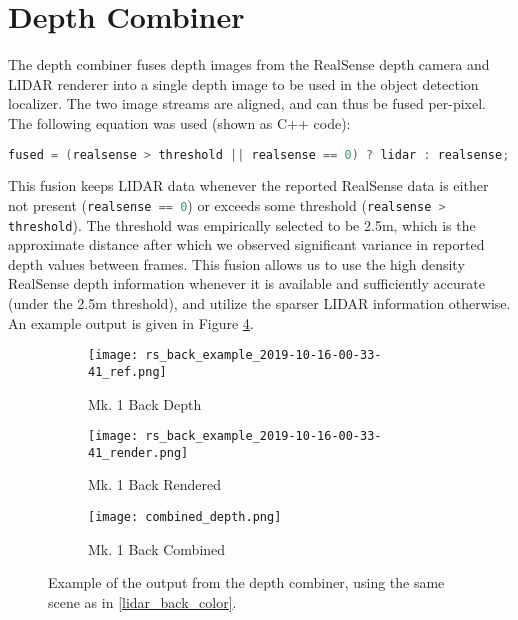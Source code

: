 \section{Depth Combiner}

The depth combiner fuses depth images from the RealSense depth camera and LIDAR renderer into a single depth image to be used in the object detection localizer. The two image streams are aligned, and can thus be fused per-pixel. The following equation was used (shown as C++ code):

\begin{lstlisting}[language=c++]
fused = (realsense > threshold || realsense == 0) ? lidar : realsense;
\end{lstlisting}

This fusion keeps LIDAR data whenever the reported RealSense data is either not present (\lstinline[language=c++]{realsense == 0}) or exceeds some threshold (\lstinline[language=c++]{realsense > threshold}). The threshold was empirically selected to be 2.5m, which is the approximate distance after which we observed significant variance in reported depth values between frames. This fusion allows us to use the high density RealSense depth information whenever it is available and sufficiently accurate (under the 2.5m threshold), and utilize the sparser LIDAR information otherwise. An example output is given in Figure \ref{combined_depth}.

\begin{figure}
	\centering
	\begin{subfigure}{0.3\textwidth}
		\texttt{[image: rs\_back\_example\_2019-10-16-00-33-41\_ref.png]}
		\caption{Mk. 1 Back Depth}
		\label{combined_depth_realsense}		
	\end{subfigure}
	\hfill
	\begin{subfigure}{0.3\textwidth}
		\texttt{[image: rs\_back\_example\_2019-10-16-00-33-41\_render.png]}
		\caption{Mk. 1 Back Rendered}
		\label{combined_depth_lidar}
	\end{subfigure}	
	\hfill
	\begin{subfigure}{0.3\textwidth}
		\texttt{[image: combined\_depth.png]}
		\caption{Mk. 1 Back Combined}
		\label{combined_depth_output}
	\end{subfigure}		
	\caption[Depth combiner sample output]{Example of the output from the depth combiner, using the same scene as in \ref{lidar_back_color}.}
	\label{combined_depth}
\end{figure}


